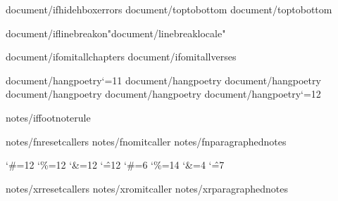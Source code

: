 
{document/ifhidehboxerrors}\overfullrule=0pt
{document/toptobottom}     %
{document/toptobottom}\rotatetrue

{document/iflinebreakon}\XeTeXlinebreaklocale "{document/linebreaklocale}"

{document/ifomitallchapters}\def\AfterChapterSpaceFactor{{10}}
{document/ifomitallverses}\def\AfterVerseSpaceFactor{{0}}

{document/hangpoetry}\catcode`\@=11
{document/hangpoetry}
{document/hangpoetry}
{document/hangpoetry}
{document/hangpoetry}
{document/hangpoetry}\catcode`\@=12


{notes/iffootnoterule}\def\footnoterule{{}} 

{notes/fnresetcallers}
{notes/fnomitcaller}
{notes/fnparagraphednotes}

\catcode`\#=12 \catcode`\%=12 \catcode`\&=12 \catcode`\^=12
\catcode`\#=6 \catcode`\%=14 \catcode`\&=4 \catcode`\^=7
%

{notes/xrresetcallers}
{notes/xromitcaller}
{notes/xrparagraphednotes}

